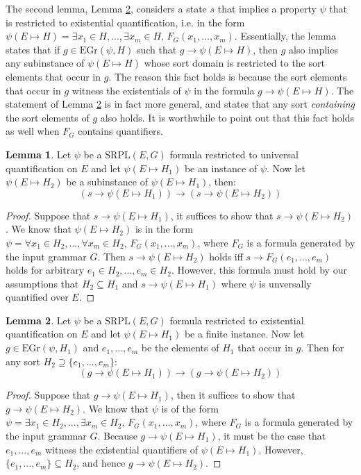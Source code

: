 \documentclass[12pt]{article}
\theoremstyle{definition}
\newtheorem{lemma}{Lemma}
\theoremstyle{remark}
\newcommand{\gr}{\text{EGr}}
\newcommand{\SRPL}{\text{SRPL}}
\begin{document}
The second lemma, Lemma \ref{lem:exists-lower}, considers a state $s$ that implies a property $\psi$ that is restricted to existential quantification, i.e. in the form $\psi(E \mapsto H) = \exists x_1 \in H,...,\exists x_m \in H, \, F_G(x_1,...,x_m)$.  Essentially, the lemma states that if $g \in \gr(\psi,H)$ such that $g \rightarrow \psi(E \mapsto H)$, then $g$ also implies any subinstance of $\psi(E \mapsto H)$ whose sort domain is restricted to the sort elements that occur in $g$.  The reason this fact holds is because the sort elements that occur in $g$ witness the existentials of $\psi$ in the formula $g \rightarrow \psi(E \mapsto H)$.  The statement of Lemma \ref{lem:exists-lower} is in fact more general, and states that any sort \textit{containing} the sort elements of $g$ also holds.  It is worthwhile to point out that this fact holds as well when $F_G$ contains quantifiers.

\begin{lemma}
  \label{lem:forall-lower}
  Let $\psi$ be a $\SRPL(E,G)$ formula restricted to universal quantification on $E$ and let $\psi(E \mapsto H_1)$ be an instance of $\psi$.  Now let $\psi(E \mapsto H_2)$ be a subinstance of $\psi(E \mapsto H_1)$, then:
  $$(s \rightarrow \psi(E \mapsto H_1)) \rightarrow (s \rightarrow \psi(E \mapsto H_2))$$
\end{lemma}
\begin{proof}
  Suppose that $s \rightarrow \psi(E \mapsto H_1)$, it suffices to show that $s \rightarrow \psi(E \mapsto H_2)$.  We know that $\psi(E \mapsto H_2)$ is in the form $\psi = \forall x_1 \in H_2,...,\forall x_m \in H_2, \, F_G(x_1,...,x_m)$, where $F_G$ is a formula generated by the input grammar $G$.  Then $s \rightarrow \psi(E \mapsto H_2)$ holds iff $s \rightarrow F_G(e_1,...,e_m)$ holds for arbitrary $e_1 \in H_2,...,e_m \in H_2$.  However, this formula must hold by our assumptions that $H_2 \subseteq H_1$ and $s \rightarrow \psi(E \mapsto H_1)$ where $\psi$ is unversally quantified over $E$.
\end{proof}

\begin{lemma}
  \label{lem:exists-lower}
  Let $\psi$ be a $\SRPL(E,G)$ formula restricted to existential quantification on $E$ and let $\psi(E \mapsto H_1)$ be a finite instance.  Now let $g \in \gr(\psi,H_1)$ and $e_1,...,e_m$ be the elements of $H_1$ that occur in $g$.  Then for any sort $H_2 \supseteq \{e_1,...,e_m\}$:
  $$(g \rightarrow \psi(E \mapsto H_1)) \rightarrow (g \rightarrow \psi(E \mapsto H_2))$$
\end{lemma}
\begin{proof}
  Suppose that $g \rightarrow \psi(E \mapsto H_1)$, then it suffices to show that $g \rightarrow \psi(E \mapsto H_2)$.  We know that $\psi$ is of the form $\psi = \exists x_1 \in H_2,...,\exists x_m \in H_2, \, F_G(x_1,...,x_m)$, where $F_G$ is a formula generated by the input grammar $G$.  Because $g \rightarrow \psi(E \mapsto H_1)$, it must be the case that $e_1,...,e_m$ witness the existential quantifiers of $\psi(E \mapsto H_1)$.  However, $\{e_1,...,e_m\} \subseteq H_2$, and hence $g \rightarrow \psi(E \mapsto H_2)$.
\end{proof}
\end{document}
